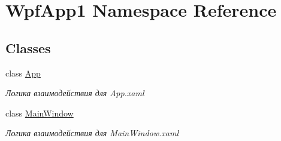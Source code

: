 \hypertarget{namespace_wpf_app1}{}\section{Wpf\+App1 Namespace Reference}
\label{namespace_wpf_app1}
\subsection*{Classes}
\begin{DoxyCompactItemize}
\item 
class \mbox{\hyperlink{class_wpf_app1_1_1_app}{App}}
\begin{DoxyCompactList}\small\item\em Логика взаимодействия для App.\+xaml \end{DoxyCompactList}\item 
class \mbox{\hyperlink{class_wpf_app1_1_1_main_window}{Main\+Window}}
\begin{DoxyCompactList}\small\item\em Логика взаимодействия для Main\+Window.\+xaml \end{DoxyCompactList}\end{DoxyCompactItemize}
